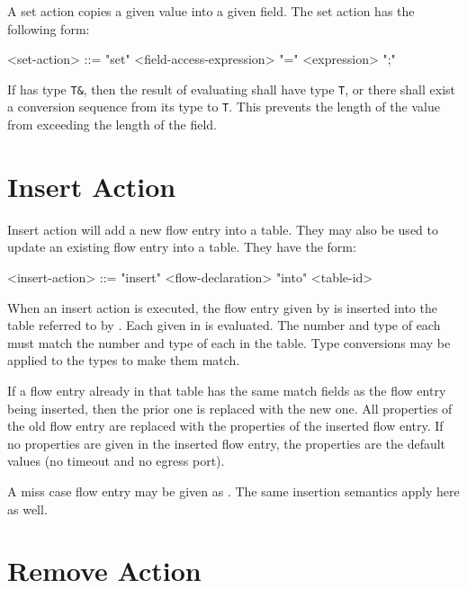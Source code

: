 A set action copies a given value into a given field. The set action has the following form:

\begin{minip}
\begin{grammar}
<set-action> ::= "set" <field-access-expression> "=" <expression> ";"
\end{grammar}
\end{minip}

If  has type \texttt{T\&}, then the result of evaluating  shall have type \texttt{T}, or there shall exist a conversion sequence from its type to \texttt{T}. This prevents the length of the value from exceeding the length of the field.

\section{Insert Action} \label{guide:insert_flow}

Insert action will add a new flow entry into a table. They may also be used to update an existing flow entry into a table. They have the form:

\begin{minip}
\begin{grammar}
<insert-action> ::= "insert" <flow-declaration> "into" <table-id>
\end{grammar}
\end{minip}

When an insert action is executed, the flow entry given by  is inserted into the table referred to by . Each  given in  is evaluated. The number and type of each  must match the number and type of each  in the table. Type conversions may be applied to the types to make them match. 

If a flow entry already in that table has the same match fields as the flow entry being inserted, then the prior one is replaced with the new one. All properties of the old flow entry are replaced with the properties of the inserted flow entry. If no properties are given in the inserted flow entry, the properties are the default values (no timeout and no egress port).

A miss case flow entry may be given as . The same insertion semantics apply here as well.

\section{Remove Action} \label{guide:remove_flow}

